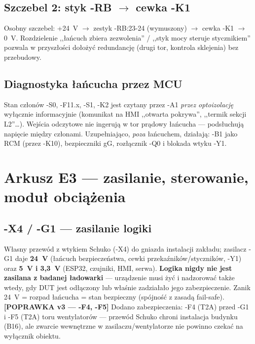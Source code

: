 \documentclass[11pt,a4paper]{article}
\newcommand{\popr}[1]{\textbf{\color{granat}[POPRAWKA v3 --- #1]}}
\begin{document}
\subsection{Szczebel 2: styk -RB $\to$ cewka -K1}
Osobny szczebel: +24~V $\to$ zestyk -RB:23-24 (wymuszony) $\to$ cewka -K1 $\to$ 0~V.
Rozdzielenie ,,łańcuch zbiera zezwolenia'' / ,,styk mocy steruje stycznikiem'' pozwala
w przyszłości dołożyć redundancję (drugi tor, kontrola sklejenia) bez przebudowy.

\subsection{Diagnostyka łańcucha przez MCU}
Stan członów -S0, -F11.x, -S1, -K2 jest czytany przez -A1 \emph{przez optoizolację} wyłącznie
informacyjnie (komunikat na HMI ,,otwarta pokrywa'', ,,termik sekcji L2''\ldots). Wejścia odczytowe
nie ingerują w tor prądowy łańcucha --- podsłuchują napięcie między członami. Uzupełniająco,
\emph{poza} łańcuchem, działają: -B1 jako RCM (przez -K10), bezpieczniki gG, rozłącznik -Q0
i blokada wtyku -Y1.

\section{Arkusz E3 --- zasilanie, sterowanie, moduł obciążenia}
\label{sec:e3}

\subsection{-X4 / -G1 --- zasilanie logiki}
Własny przewód z wtykiem Schuko (-X4) do gniazda instalacji zakładu; zasilacz -G1 daje
\textbf{24~V} (łańcuch bezpieczeństwa, cewki przekaźników/styczników, -Y1) oraz \textbf{5~V
i 3,3~V} (ESP32, czujniki, HMI, serwa). \textbf{Logika nigdy nie jest zasilana z badanej
ładowarki} --- urządzenie musi żyć i nadzorować także wtedy, gdy DUT jest odłączony lub właśnie
zadziałało jego zabezpieczenie. Zanik 24~V = rozpad łańcucha = stan bezpieczny (spójność
z zasadą fail-safe). \popr{-F4, -F5} Dodano zabezpieczenia: -F4 (T2A) przed -G1
i -F5 (T2A) toru wentylatorów --- przewód Schuko chroni instalacja budynku (B16), ale zwarcie
wewnętrzne w zasilaczu/wentylatorze nie powinno czekać na wyłącznik obiektu.
\end{document}
